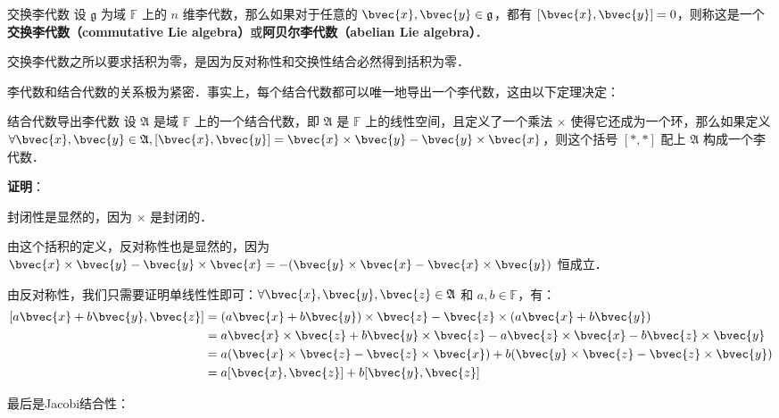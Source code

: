 \begin{definition}{交换李代数}
设 $\mathfrak{g}$ 为域 $\mathbb{F}$ 上的 $n$ 维李代数，那么如果对于任意的 $\bvec{x},\bvec{y}\in\mathfrak{g}$，都有 $[\bvec{x}, \bvec{y}]=0$，则称这是一个\textbf{交换李代数（commutative Lie algebra）}或\textbf{阿贝尔李代数（abelian Lie algebra）}．
\end{definition}

交换李代数之所以要求括积为零，是因为反对称性和交换性结合必然得到括积为零．

李代数和结合代数的关系极为紧密．事实上，每个结合代数都可以唯一地导出一个李代数，这由以下定理决定：

\begin{theorem}{结合代数导出李代数}
设 $\mathfrak{A}$ 是域 $\mathbb{F}$ 上的一个结合代数，即 $\mathfrak{A}$ 是 $\mathbb{F}$ 上的线性空间，且定义了一个乘法 $\times$ 使得它还成为一个环，那么如果定义 $\forall \bvec{x}, \bvec{y}\in\mathfrak{A}, [\bvec{x}, \bvec{y}]=\bvec{x}\times \bvec{y}-\bvec{y}\times \bvec{x}$，则这个括号 $[*, *]$ 配上 $\mathfrak{A}$ 构成一个李代数．
\end{theorem}

\textbf{证明}：

封闭性是显然的，因为 $\times$ 是封闭的．

由这个括积的定义，反对称性也是显然的，因为 $\bvec{x}\times \bvec{y}-\bvec{y}\times \bvec{x}=-(\bvec{y}\times \bvec{x}-\bvec{x}\times \bvec{y})$ 恒成立．

由反对称性，我们只需要证明单线性性即可：$\forall \bvec{x}, \bvec{y}, \bvec{z}\in\frak{A}$ 和 $a, b\in\mathbb{F}$，有：
\begin{equation}
\begin{aligned}
{[a\bvec{x}+b\bvec{y}, \bvec{z}]}&=(a\bvec{x}+b\bvec{y})\times\bvec{z}-\bvec{z}\times(a\bvec{x}+b\bvec{y})\\
&=a\bvec{x}\times\bvec{z}+b\bvec{y}\times\bvec{z}-a\bvec{z}\times\bvec{x}-b\bvec{z}\times\bvec{y}\\
&=a(\bvec{x}\times\bvec{z}-\bvec{z}\times\bvec{x})+b(\bvec{y}\times\bvec{z}-\bvec{z}\times\bvec{y})\\
&=a[\bvec{x}, \bvec{z}]+b[\bvec{y}, \bvec{z}]
\end{aligned}
\end{equation}

最后是Jacobi结合性：

